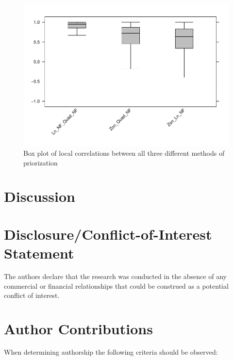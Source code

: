 \documentclass[]{article}
\begin{document}
\begin{figure}
\centering
\includegraphics{NFPaper_files/figure-latex/Boxplot-1.pdf}
\caption{\label{fig:Boxplot}Box plot of local correlations between all three different methods of priorization}
\end{figure}

\hypertarget{discussion}{%
\section{Discussion}\label{discussion}}

\hypertarget{disclosureconflict-of-interest-statement}{%
\section*{Disclosure/Conflict-of-Interest Statement}\label{disclosureconflict-of-interest-statement}}

The authors declare that the research was conducted in the absence of any
commercial or financial relationships that could be construed as a potential
conflict of interest.

\hypertarget{author-contributions}{%
\section*{Author Contributions}\label{author-contributions}}

When determining authorship the following criteria should be observed:
\end{document}
